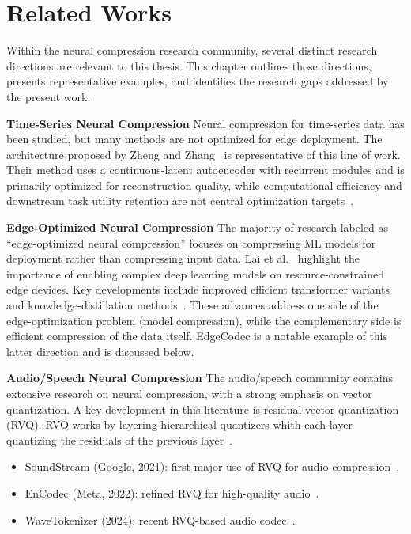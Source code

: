 \chapter{Related Works}
\label{chap:related-works}

Within the neural compression research community, several distinct research directions are relevant to this thesis. This chapter outlines those directions, presents representative examples, and identifies the research gaps addressed by the present work.

\textbf{Time-Series Neural Compression} Neural compression for time-series data has been studied, but many methods are not optimized for edge deployment. The architecture proposed by Zheng and Zhang~\cite{Zheng2023} is representative of this line of work. Their method uses a continuous-latent autoencoder with recurrent modules and is primarily optimized for reconstruction quality, while computational efficiency and downstream task utility retention are not central optimization targets~\cite{Zheng2023}.

\textbf{Edge-Optimized Neural Compression} The majority of research labeled as ``edge-optimized neural compression'' focuses on compressing ML models for deployment rather than compressing input data. Lai et al.~\cite{Lai2026} highlight the importance of enabling complex deep learning models on resource-constrained edge devices. Key developments include improved efficient transformer variants and knowledge-distillation methods~\cite{Lai2026}. These advances address one side of the edge-optimization problem (model compression), while the complementary side is efficient compression of the data itself. EdgeCodec is a notable example of this latter direction and is discussed below.

\textbf{Audio/Speech Neural Compression} The audio/speech community contains extensive research on neural compression, with a strong emphasis on vector quantization. A key development in this literature is residual vector quantization (RVQ). RVQ works by layering hierarchical quantizers whith each layer quantizing the residuals of the previous layer~\cite[pp.~495--507]{Zeghidour2021}.

\begin{itemize}
    \item SoundStream (Google, 2021): first major use of RVQ for audio compression~\cite[pp.~495--507]{Zeghidour2021}.
    \item EnCodec (Meta, 2022): refined RVQ for high-quality audio~\cite{Defossez2022}.
    \item WaveTokenizer (2024): recent RVQ-based audio codec~\cite{Ji2025}.
\end{itemize}

